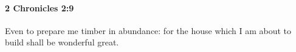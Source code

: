 
		\paragraph{2 Chronicles 2:9} %
			\label{2CHRONICLES-2-9}

			Even to prepare me timber in abundance: for the house which I am about to build shall be wonderful great.


